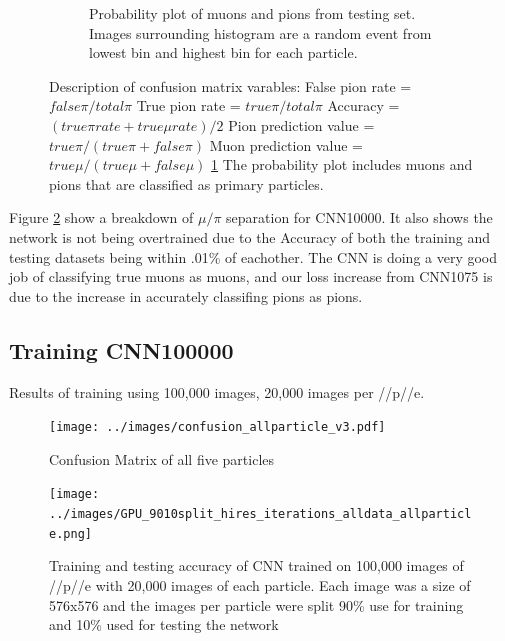 \begin{figure}[htp!]
\begin{subfigure}[b]{\textwidth}
	\caption{Probability plot of muons and pions from testing set. Images surrounding histogram are a random event from lowest bin and highest bin for each particle.}
	\label{fig:prob_plot}
	\end{subfigure}
\caption{Description of confusion matrix varables: False pion rate = $false \pi/ total \pi$ True pion rate = $true \pi/total \pi$ Accuracy = $(true \pi rate + true \mu rate)/2$ Pion prediction value = $true \pi/(true \pi + false \pi)$ Muon prediction value = $true \mu/(true \mu + false \mu)$ \ref{fig:prob_plot} The probability plot includes muons and pions that are classified as primary particles.}
\label{fig:CNN_train}
\end{figure}

Figure \ref{fig:CNN_train} show a breakdown of $\mu/\pi$ separation for CNN10000. It also shows the network is not being overtrained due to the Accuracy of both the training and testing datasets being within .01\% of eachother. The CNN is doing a very good job of classifying true muons as muons, and our loss increase from CNN1075 is due to the increase in accurately classifing pions as pions. 



\subsection{Training CNN100000}
Results of training using 100,000 images, 20,000 images per \mu/\pi/p/\gamma/e. 
\begin{figure}[htp]
\centering
\texttt{[image: ../images/confusion\_allparticle\_v3.pdf]}
\caption{Confusion Matrix of all five particles }
\label{fig:confusion100000}
\end{figure}

\begin{figure}[htp]
\centering
\texttt{[image: ../images/GPU\_9010split\_hires\_iterations\_alldata\_allparticle.png]}
\caption{Training and testing accuracy of CNN trained on 100,000 images of \mu/\pi/p/\gamma/e with 20,000 images of each particle. Each image was a size of 576x576 and the images per particle were split 90\% use for training and 10\% used for testing the network}
\label{fig:gpuacc}
\end{figure}

